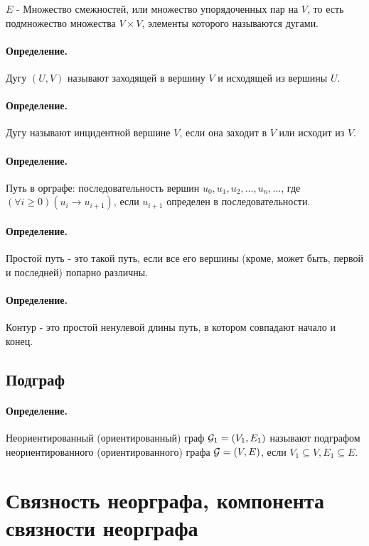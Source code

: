 \documentclass{report}
\begin{document}
$E$ - Множество смежностей, или множество упорядоченных пар на  $V$, то есть подмножество
множества  $V \times V$, элементы которого называются дугами.

\paragraph*{Определение.}
Дугу $(U, V)$ называют заходящей в вершину  $V$ и исходящей из вершины  $U$.

\paragraph*{Определение.}
Дугу называют инцидентной вершине $V$, если она заходит в  $V$ или исходит из $V$.

\paragraph*{Определение.}
Путь в орграфе: последовательность вершин $u_0, u_1, u_2,\ldots,u_n,\ldots$, где $(\forall i \ge  0)
	(u_i \to u_{i+1})$, если $u_{i+1}$ определен в последовательности.

\paragraph*{Определение.}
Простой путь - это такой путь, если все его вершины (кроме, может быть, первой и последней)
попарно различны.

\paragraph*{Определение.}
Контур - это простой ненулевой длины путь, в котором совпадают начало и конец.

\subsection{Подграф}
\paragraph*{Определение.}
Неориентированный (ориентированный) граф $ {\cal G}_1 = (V_1, E_1)$ называют подграфом
неориентированного (ориентированного) графа $ {\cal G} = (V, E)$, если
$V_1 \subseteq V, E_1 \subseteq E$.

\newpage

\section{Связность неорграфа, компонента связности неорграфа}
\end{document}
